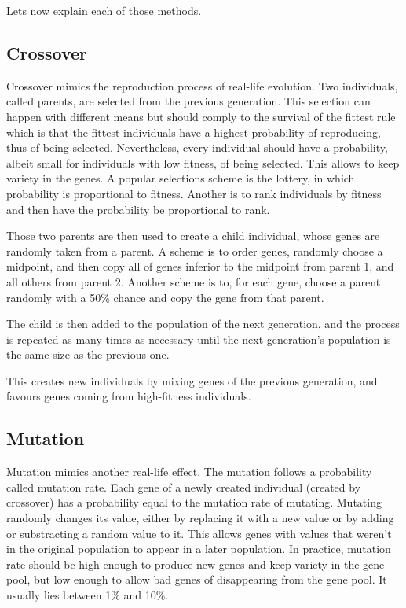 \documentclass{acm_proc_article-sp}
\begin{document}
Lets now explain each of those methods.
\subsection{Crossover}
Crossover mimics the reproduction process of real-life evolution. Two individuals, called parents, are selected from the previous generation. This selection can happen with different means but should comply to the survival of the fittest rule which is that the fittest individuals have a highest probability of reproducing, thus of being selected. Nevertheless, every individual should have a probability, albeit small for individuals with low fitness, of being selected. This allows to keep variety in the genes. A popular selections scheme is the lottery, in which probability is proportional to fitness. Another is to rank individuals by fitness and then have the probability be proportional to rank.

Those two parents are then used to create a child individual, whose genes are randomly taken from a parent. A scheme is to order genes, randomly choose a midpoint, and then copy all of genes inferior to the midpoint from parent 1, and all others from parent 2.
Another scheme is to, for each gene, choose a parent randomly with a 50\% chance and copy the gene from that parent.

The child is then added to the population of the next generation, and the process is repeated as many times as necessary until the next generation's population is the same size as the previous one.

This creates new individuals by mixing genes of the previous generation, and favours genes coming from high-fitness individuals.

\subsection{Mutation}
Mutation mimics another real-life effect. The mutation follows a probability called mutation rate. Each gene of a newly created individual (created by crossover) has a probability equal to the mutation rate of mutating. Mutating randomly changes its value, either by replacing it with a new value or by adding or substracting a random value to it. This allows genes with values that weren't in the original population  to appear in a later population. In practice, mutation rate should be high enough to produce new genes and keep variety in the gene pool, but low enough to allow bad genes of disappearing from the gene pool. It usually lies between 1\% and 10\%.
\end{document}

